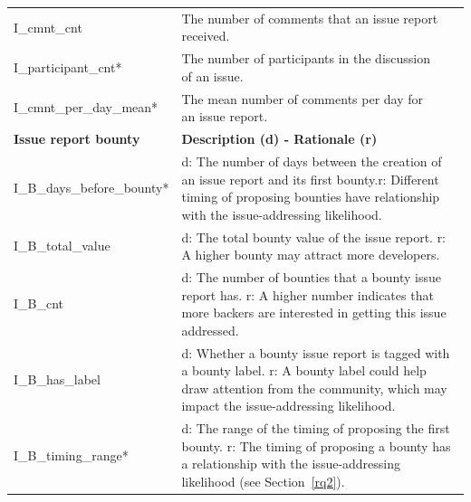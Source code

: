 \begin{table}[]
\begin{tabular}{p{12em}p{29em}p{19em}}
     I\_cmnt\_cnt                     & The number of comments that an issue report received. & \\
	I\_participant\_cnt* & The number of participants in the discussion of an issue. & \\
     I\_cmnt\_per\_day\_mean* & The mean number of comments per day for an issue report. &  \\
 \midrule
     \textbf{Issue report bounty} & \multicolumn{2}{l}{\textbf{Description (d) - Rationale (r)}} \\
     \midrule
     I\_B\_days\_before\_bounty*  & \multicolumn{2}{p{48em}}{d: The number of days between the creation of an issue report and its first bounty.\newline r: Different timing of proposing bounties have relationship with the issue-addressing likelihood.} %
     \\
      I\_B\_total\_value & \multicolumn{2}{p{48em}}{d: The total bounty value of the issue report. \newline r: A higher bounty may attract more developers.} \\
      I\_B\_cnt    &  \multicolumn{2}{p{48em}}{d: The number of bounties that a bounty issue report has. \newline r: A higher number indicates that more backers are interested in getting this issue  addressed.} \\
     I\_B\_has\_label  &  \multicolumn{2}{p{48em}}{d: Whether a bounty issue report is tagged with a bounty label. \newline r: A bounty label could help draw attention from the community, which may impact the issue-addressing likelihood. } \\
      I\_B\_timing\_range*   & \multicolumn{2}{p{48em}}{d: The range of the timing of proposing the first bounty.                                                                                 \newline r: The timing of proposing a bounty has a relationship with the issue-addressing likelihood (see Section~\ref{rq2}).} \\
     \bottomrule
     \end{tabular}%
     \vspace{-0.1in}
 \end{table}%

